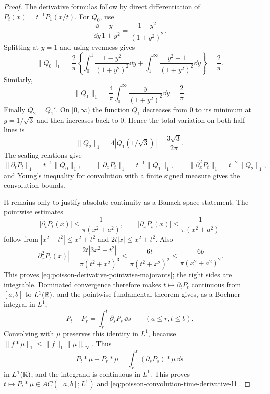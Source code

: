 \begin{proof}
The derivative formulas follow by direct differentiation of
\(P_t(x)=t^{-1}P_1(x/t)\).  For \(Q_0\), use
\[
\frac{\dd}{\dd y}\frac{y}{1+y^2}
=\frac{1-y^2}{(1+y^2)^2}.
\]
Splitting at \(y=1\) and using evenness gives
\[
\|Q_0\|_1
=\frac2\pi\left\{
\int_0^1\frac{1-y^2}{(1+y^2)^2}\dd y
+\int_1^\infty\frac{y^2-1}{(1+y^2)^2}\dd y
\right\}
=\frac2\pi.
\]
Similarly,
\[
\|Q_1\|_1
=\frac4\pi\int_0^\infty\frac{y}{(1+y^2)^2}\dd y
=\frac2\pi.
\]
Finally \(Q_2=Q_1'\).  On \([0,\infty)\) the function \(Q_1\) decreases
from \(0\) to its minimum at \(y=1/\sqrt3\) and then increases back to
\(0\).  Hence the total variation on both half-lines is
\[
\|Q_2\|_1
=4\left|Q_1(1/\sqrt3)\right|
=\frac{3\sqrt3}{2\pi}.
\]
The scaling relations give
\[
\|\partial_tP_t\|_1=t^{-1}\|Q_0\|_1,\qquad
\|\partial_xP_t\|_1=t^{-1}\|Q_1\|_1,\qquad
\|\partial_x^2P_t\|_1=t^{-2}\|Q_2\|_1,
\]
and Young's inequality for convolution with a finite signed measure gives
the convolution bounds.

It remains only to justify absolute continuity as a Banach-space statement.
The pointwise estimates
\[
|\partial_tP_t(x)|\le\frac{1}{\pi(x^2+a^2)},\qquad
|\partial_xP_t(x)|\le\frac{1}{\pi(x^2+a^2)}
\]
follow from
\(|x^2-t^2|\le x^2+t^2\) and \(2t|x|\le x^2+t^2\).  Also
\[
|\partial_x^2P_t(x)|
=\frac{2t|3x^2-t^2|}{\pi(t^2+x^2)^3}
\le \frac{6t}{\pi(t^2+x^2)^2}
\le \frac{6b}{\pi(x^2+a^2)^2}.
\]
This proves \eqref{eq:poisson-derivative-pointwise-majorants}; the right
sides are integrable.  Dominated convergence therefore makes
\(t\mapsto\partial_tP_t\) continuous from \([a,b]\) to \(L^1(\mathbb{R})\), and
the pointwise fundamental theorem gives, as a Bochner integral in \(L^1\),
\[
P_t-P_r=\int_r^t\partial_sP_s\,\dd s\qquad(a\le r,t\le b).
\]
Convolving with \(\mu\) preserves this identity in \(L^1\), because
\(\|f*\mu\|_1\le\|f\|_1\|\mu\|_{\mathrm{TV}}\).  Thus
\[
P_t*\mu-P_r*\mu
=\int_r^t(\partial_sP_s)*\mu\,\dd s
\]
in \(L^1(\mathbb{R})\), and the integrand is continuous in \(L^1\).  This proves
\(t\mapsto P_t*\mu\in AC([a,b];L^1)\) and
\eqref{eq:poisson-convolution-time-derivative-l1}.
\end{proof}

